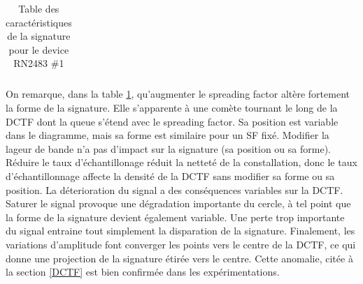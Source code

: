 \begin{table}[h]
\begin{tabular}{|c|c|c|c|c|}
\hline
\end{tabular}
\caption{Table des caractéristiques de la signature pour le device RN2483 \#1}
\label{signature1}
\end{table}

On remarque, dans la table \ref{signature1}, qu'augmenter le spreading factor altère fortement la forme de la signature. Elle s'apparente à une comète tournant le long de la \ac{DCTF} dont la queue s'étend avec le spreading factor. Sa position est variable dans le diagramme, mais sa forme est similaire pour un SF fixé. Modifier la lageur de bande n'a pas d'impact sur la signature (sa position ou sa forme). Réduire le taux d'échantillonage réduit la netteté de la constallation, donc le taux d'échantillonnage affecte la densité de la \ac{DCTF} sans modifier sa forme ou sa position. La déterioration du signal a des conséquences variables sur la \ac{DCTF}. Saturer le signal provoque une dégradation importante du cercle, à tel point que la forme de la signature devient également variable. Une perte trop importante du signal entraine tout simplement la disparation de la signature. Finalement, les variations d'amplitude font converger les points vers le centre de la \ac{DCTF}, ce qui donne une projection de la signature étirée vers le centre. Cette anomalie, citée à la section \ref{DCTF} est bien confirmée dans les expérimentations.

